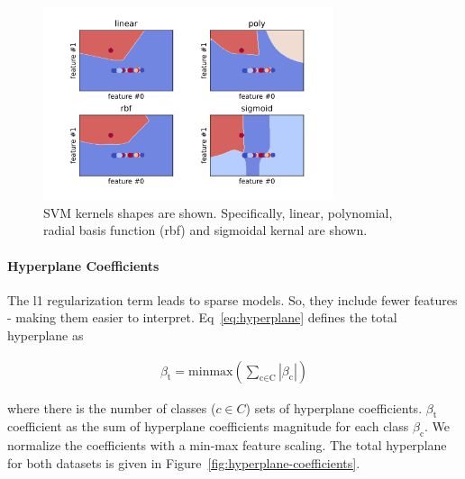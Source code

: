 \documentclass[runningheads]{llncs}
\begin{document}
\begin{figure}[htb]
  \centering
  \includegraphics[width=8.5cm]{kernels.png}
  \caption{
    SVM kernels shapes are shown.
    Specifically, linear, polynomial, radial basis function (rbf) and sigmoidal kernal are shown.}
  \label{fig:kernels}
\end{figure}

\paragraph{Hyperplane Coefficients}
\label{sec:background-svm-hyperplane}

The l1 regularization term leads to sparse models.
So, they include fewer features - making them easier to interpret.
Eq~\ref{eq:hyperplane} defines the total hyperplane as

\begin{align}\label{eq:hyperplane}
  \beta_{\text{t}} = \text{minmax}(
  \sum_{\text{c} \in \text{C}}
  |\beta_{\text{c}}|
  )
\end{align}

where there is the number of classes ($c \in C$) sets of hyperplane coefficients.
$\beta_{\text{t}}$ coefficient as the sum of hyperplane coefficients magnitude for each class $\beta_{\text{c}}$.
We normalize the coefficients with a min-max feature scaling.
The total hyperplane for both datasets is given in Figure~\ref{fig:hyperplane-coefficients}.
\end{document}
